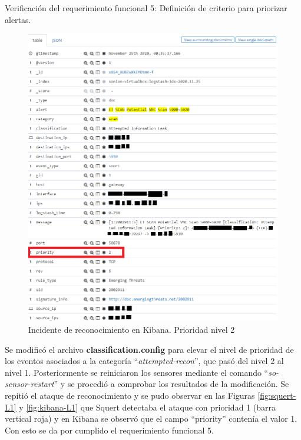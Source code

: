 \begin{section}{Verificación del requerimiento funcional 5: Definición de criterio para priorizar alertas.}
\begin{figure}[H]
        \includegraphics[width=1\textwidth]{./iteracion_3_imagenes/kibana_ataques_L2_1EDITADO.png}
        \caption{Incidente de reconocimiento en Kibana. Prioridad nivel 2}
        \label{fig:Kibana-L2}
    \end{figure}
    \FloatBarrier
    Se modificó el archivo \textbf{classification.config} para elevar el nivel de prioridad de los eventos asociados a la categoría “\textit{attempted-recon}”, que pasó del nivel 2 al nivel 1. Posteriormente se reiniciaron los sensores mediante el comando “\textit{so-sensor-restart}” y se procedió a comprobar los resultados de la modificación. Se repitió el ataque de reconocimiento y se pudo observar en las Figuras \ref{fig:squert-L1} y \ref{fig:kibana-L1} que Squert detectaba el ataque con prioridad 1 (barra vertical roja) y en Kibana se observó que el campo “priority” contenía el valor 1. Con esto se da por cumplido el requerimiento funcional 5.
    

\end{section}
